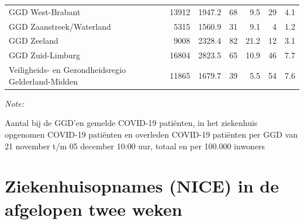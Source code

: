 \documentclass[
  english,
  man,floatsintext]{apa6}
\begin{document}
\begin{table}
\begin{threeparttable}
\begin{tabular}{lrrrrrr}
GGD West-Brabant & 13912 & 1947.2 & 68 & 9.5 & 29 & 4.1\\
GGD Zaanstreek/Waterland & 5315 & 1560.9 & 31 & 9.1 & 4 & 1.2\\
GGD Zeeland & 9008 & 2328.4 & 82 & 21.2 & 12 & 3.1\\
GGD Zuid-Limburg & 16804 & 2823.5 & 65 & 10.9 & 46 & 7.7\\
Veiligheids- en Gezondheidsregio Gelderland-Midden & 11865 & 1679.7 & 39 & 5.5 & 54 & 7.6\\
\bottomrule
\end{tabular}
\begin{tablenotes}
\item \textit{Note: } 
\item Aantal bij de GGD’en gemelde COVID-19 patiënten, in het ziekenhuis opgenomen COVID-19 patiënten en overleden COVID-19 patiënten per GGD van 21 november t/m 05 december 10:00 uur, totaal en per 100.000 inwoners
\end{tablenotes}
\end{threeparttable}
\endgroup{}
\end{table}

\newpage

\hypertarget{ziekenhuisopnames-nice-in-de-afgelopen-twee-weken}{%
\section{Ziekenhuisopnames (NICE) in de afgelopen twee weken}\label{ziekenhuisopnames-nice-in-de-afgelopen-twee-weken}}
\end{document}

